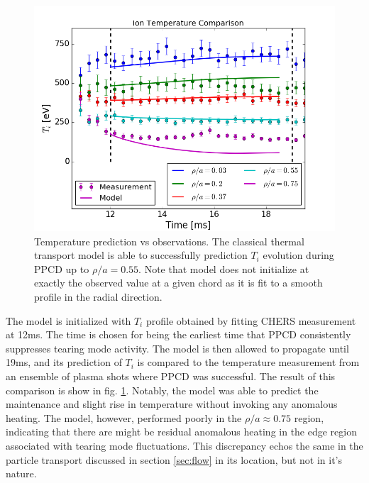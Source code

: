 \documentclass[aip, pop, preprint]{revtex4-1}
\begin{document}
\begin{figure}[!ht]
	\centering
	\includegraphics[width=0.95\columnwidth]{./plots/temp_comp_ext_full}
	\caption{Temperature prediction vs observations. The classical thermal transport model is able to successfully prediction $T_i$ evolution during PPCD up to $\rho /a = 0.55$. Note that model does not initialize at exactly the observed value at a given chord as it is fit to a smooth profile in the radial direction.\label{fig:comp}}
\end{figure}

The model is initialized with $T_i$ profile obtained by fitting CHERS
measurement at 12ms. The time is chosen for being the earliest time that PPCD
consistently suppresses tearing mode activity. The model is then allowed to
propagate until 19ms, and its prediction of $T_i$ is compared to the
temperature measurement from an ensemble of plasma shots where PPCD was
successful. The result of this comparison is show in fig. \ref{fig:comp}.
Notably, the model was able to predict the maintenance and slight rise in
temperature without invoking any anomalous heating. The model, however,
performed poorly in the $\rho /a \approx 0.75$ region, indicating that there are might be residual anomalous heating in the edge region associated with tearing mode fluctuations. This discrepancy echos the same in the particle transport discussed in section \ref{sec:flow} in its location, but not in it's nature. 
\end{document}
